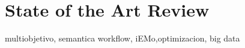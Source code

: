 \chapter{State of the Art Review} %

\label{stateofart} %

multiobjetivo, semantica workflow, iEMo,optimizacion, big data

